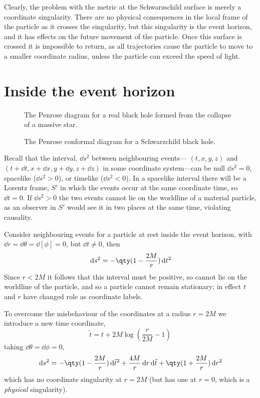 Clearly, the problem with the metric at the Schwarzschild surface is
merely a coordinate singularity. There are no physical consequences in
the local frame of the particle as it crosses the singularity, but
this singularity is the event horizon, and it has effects on the
future movement of the particle. Once this surface is crossed it is
impossible to return, as all trajectories cause the particle to move
to a smaller coordinate radius, unless the particle can exceed the
speed of light.

\section{Inside the event horizon}
\label{sec:inside-event-horizon}

\begin{figure}[t]
  \centering
  
  \caption{The Penrose diagram for a real black hole formed from the collapse of a massive star.}
  \label{fig:real-black-hole}
\end{figure}

\begin{figure}[b]
  \centering
  
  \caption{The Penrose conformal diagram for a Schwarzchild black hole.}
  \label{fig:schwarz-conformal}
\end{figure}

Recall that the interval, $\dd{s}^2$ between neighbouring events---
$(t,x,y,z)$ and $(t+\dd{t}, x+\dd{x}, y+\dd{y}, z+\dd{z})$ in some
coordinate system---can be null $\dd{s}^2=0$, spacelike ($\dd{s}^2>0$),
or timelike ($\dd{s}^2<0$). In a spacelike interval there will be a
Lorentz frame, $S'$ in which the events occur at the same coordinate
time, so $\dd{t}=0$. If $\dd{s}^2>0$ the two events cannot lie on the
worldline of a material particle, as an observer in $S'$ would see it
in two places at the same time, violating causality.

Consider neighbouring events for a particle at rest inside the event
horizon, with $\dd{r} = \dd{\theta} = \dd[\phi] = 0$, but $\dd{t} \neq
0$, then
\[ \dd{s}^2 = - \qty( 1 - \frac{2M}{r} ) \dd{t}^2 \] Since $r<2M$ it
follows that this interval must be positive, so cannot lie on the
worldline of the particle, and so a particle cannot remain stationary;
in effect $t$ and $r$ have changed role as coordinate labels.

To overcome the misbehaviour of the coordinates at a radius $r=2M$ we
introduce a new time coordinate, 
\begin{equation}
  \label{eq:234}
  \tilde{t} = t+2M \log( \frac{r}{2M} - 1 )
\end{equation}
taking $\dd{\theta} = \dd{\phi} = 0$,
\begin{equation}
  \label{eq:235}
  \dd{s}^2 = - \qty(1 - \frac{2M}{r}) \dd{\tilde{t}}^2 + \frac{4M}{r} \dd{r} \dd{\tilde{t}} + \qty( 1 + \frac{2M}{r}) \dd{r}^2
\end{equation}
which has no coordinate singularity at $r=2M$ (but has one at $r=0$,
which is a \emph{physical} singularity).

